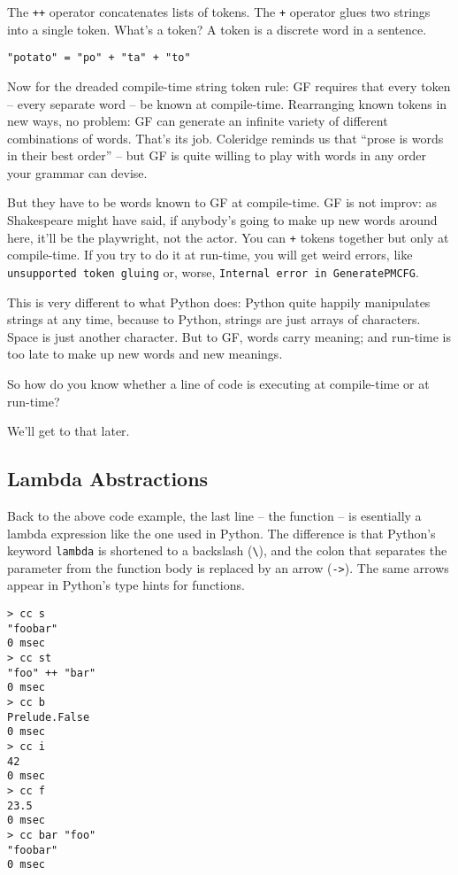 \documentclass{scrartcl}
\begin{document}
The \texttt{++} operator concatenates lists of tokens. The \texttt{+} operator glues two strings into a single token. What's a token? A token is a discrete word in a sentence.

\begin{verbatim}
"potato" = "po" + "ta" + "to"
\end{verbatim}

Now for the dreaded compile-time string token rule: GF requires that every token -- every separate word -- be known at compile-time. Rearranging known tokens in new ways, no problem: GF can generate an infinite variety of different combinations of words. That's its job. Coleridge reminds us that ``prose is words in their best order'' -- but GF is quite willing to play with words in any order your grammar can devise.

But they have to be words known to GF at compile-time. GF is not improv: as Shakespeare might have said, if anybody's going to make up new words around here, it'll be the playwright, not the actor. You can \texttt{+} tokens together but only at compile-time. If you try to do it at run-time, you will get weird errors, like \texttt{unsupported token gluing} or, worse, \texttt{Internal error in GeneratePMCFG}.

This is very different to what Python does: Python quite happily manipulates strings at any time, because to Python, strings are just arrays of characters. Space is just another character. But to GF, words carry meaning; and run-time is too late to make up new words and new meanings.

So how do you know whether a line of code is executing at compile-time or at run-time?

We'll get to that later.

\subsection{Lambda Abstractions}

Back to the above code example, the last line -- the function -- is esentially a lambda expression like the one used in Python. The difference is that Python's keyword \texttt{lambda} is shortened to a backslash (\texttt{\textbackslash}), and the colon that separates the parameter from the function body is replaced by an arrow (\texttt{->}). The same arrows appear in Python's type hints for functions.

\begin{verbatim}
> cc s
"foobar"
0 msec
> cc st
"foo" ++ "bar"
0 msec
> cc b
Prelude.False
0 msec
> cc i
42
0 msec
> cc f
23.5
0 msec
> cc bar "foo"
"foobar"
0 msec
\end{verbatim}
\end{document}
